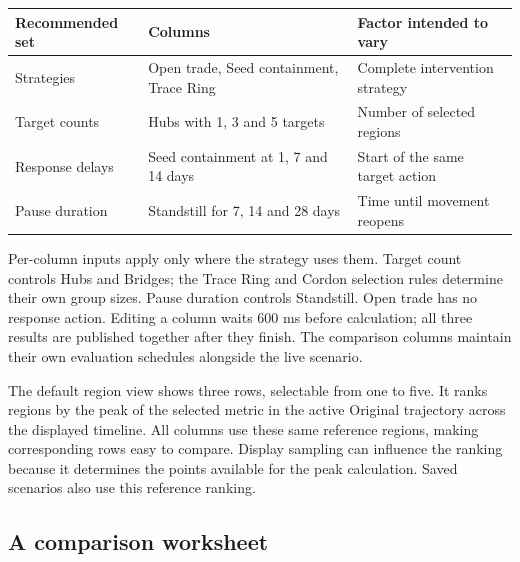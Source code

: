 \documentclass[11pt,a4paper]{article}
\begin{document}
\begin{longtable}[]{@{}
  >{\raggedright\arraybackslash}p{}
  >{\raggedright\arraybackslash}p{}
  >{\raggedright\arraybackslash}p{}@{}}
\toprule\noalign{}
\begin{minipage}[b]{\linewidth}\raggedright
Recommended set
\end{minipage} & \begin{minipage}[b]{\linewidth}\raggedright
Columns
\end{minipage} & \begin{minipage}[b]{\linewidth}\raggedright
Factor intended to vary
\end{minipage} \\
\midrule\noalign{}
\endhead
\bottomrule\noalign{}
\endlastfoot
Strategies & Open trade, Seed containment, Trace Ring & Complete
intervention strategy \\
Target counts & Hubs with 1, 3 and 5 targets & Number of selected
regions \\
Response delays & Seed containment at 1, 7 and 14 days & Start of the
same target action \\
Pause duration & Standstill for 7, 14 and 28 days & Time until movement
reopens \\
\end{longtable}

Per-column inputs apply only where the strategy uses them. Target count
controls Hubs and Bridges; the Trace Ring and Cordon selection rules
determine their own group sizes. Pause duration controls Standstill.
Open trade has no response action. Editing a column waits 600 ms before
calculation; all three results are published together after they finish.
The comparison columns maintain their own evaluation schedules alongside
the live scenario.

The default region view shows three rows, selectable from one to five.
It ranks regions by the peak of the selected metric in the active
Original trajectory across the displayed timeline. All columns use these
same reference regions, making corresponding rows easy to compare.
Display sampling can influence the ranking because it determines the
points available for the peak calculation. Saved scenarios also use this
reference ranking.

\subsection{A comparison worksheet}\label{a-comparison-worksheet}
\end{document}
